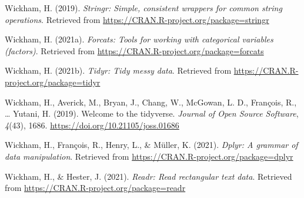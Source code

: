 \documentclass[
  man,floatsintext]{apa6}
\newlength{\cslhangindent}
\newlength{\cslentryspacingunit} %
\newenvironment{CSLReferences}[2] %
 {%
  \setlength{\parindent}{0pt}
  \ifodd #1
  \let\oldpar\par
  \def\par{\hangindent=\cslhangindent\oldpar}
  \fi
  \setlength{\parskip}{#2\cslentryspacingunit}
 }%
 {}
\begin{document}
\begin{CSLReferences}{1}{0}
\leavevmode{}%
Wickham, H. (2019). \emph{Stringr: Simple, consistent wrappers for common string operations}. Retrieved from \url{https://CRAN.R-project.org/package=stringr}

\leavevmode{}%
Wickham, H. (2021a). \emph{Forcats: Tools for working with categorical variables (factors)}. Retrieved from \url{https://CRAN.R-project.org/package=forcats}

\leavevmode{}%
Wickham, H. (2021b). \emph{Tidyr: Tidy messy data}. Retrieved from \url{https://CRAN.R-project.org/package=tidyr}

\leavevmode{}%
Wickham, H., Averick, M., Bryan, J., Chang, W., McGowan, L. D., François, R., \ldots{} Yutani, H. (2019). Welcome to the {tidyverse}. \emph{Journal of Open Source Software}, \emph{4}(43), 1686. \url{https://doi.org/10.21105/joss.01686}

\leavevmode{}%
Wickham, H., François, R., Henry, L., \& Müller, K. (2021). \emph{Dplyr: A grammar of data manipulation}. Retrieved from \url{https://CRAN.R-project.org/package=dplyr}

\leavevmode{}%
Wickham, H., \& Hester, J. (2021). \emph{Readr: Read rectangular text data}. Retrieved from \url{https://CRAN.R-project.org/package=readr}

\end{CSLReferences}

\endgroup
\end{document}
